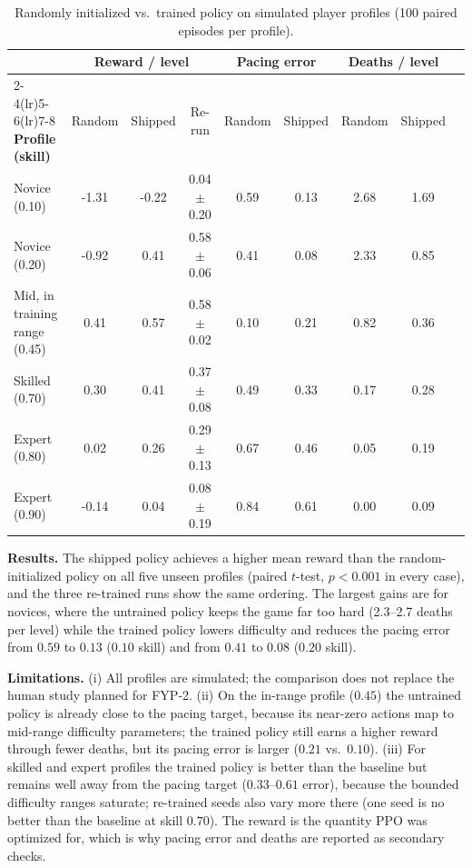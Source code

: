 \begin{table}[!htbp]
\centering
\caption{Randomly initialized vs.\ trained policy on simulated player profiles (100 paired episodes per profile).}
\label{tab:policy_eval}
\scriptsize
\begin{tabular}{p{}cccccccc}
\toprule
& \multicolumn{3}{c}{\textbf{Reward / level}} & \multicolumn{2}{c}{\textbf{Pacing error}} & \multicolumn{2}{c}{\textbf{Deaths / level}} \\
\cmidrule(lr){2-4}\cmidrule(lr){5-6}\cmidrule(lr){7-8}
\textbf{Profile (skill)} & Random & Shipped & Re-run & Random & Shipped & Random & Shipped \\
\midrule
Novice (0.10) & -1.31 & -0.22 & 0.04$\pm$0.20 & 0.59 & 0.13 & 2.68 & 1.69 \\
\midrule
Novice (0.20) & -0.92 & 0.41 & 0.58$\pm$0.06 & 0.41 & 0.08 & 2.33 & 0.85 \\
\midrule
Mid, in training range (0.45) & 0.41 & 0.57 & 0.58$\pm$0.02 & 0.10 & 0.21 & 0.82 & 0.36 \\
\midrule
Skilled (0.70) & 0.30 & 0.41 & 0.37$\pm$0.08 & 0.49 & 0.33 & 0.17 & 0.28 \\
\midrule
Expert (0.80) & 0.02 & 0.26 & 0.29$\pm$0.13 & 0.67 & 0.46 & 0.05 & 0.19 \\
\midrule
Expert (0.90) & -0.14 & 0.04 & 0.08$\pm$0.19 & 0.84 & 0.61 & 0.00 & 0.09 \\
\bottomrule
\end{tabular}
\end{table}

\textbf{Results.} The shipped policy achieves a higher mean reward than the random-initialized policy on all five unseen profiles (paired $t$-test, $p<0.001$ in every case), and the three re-trained runs show the same ordering. The largest gains are for novices, where the untrained policy keeps the game far too hard (2.3--2.7 deaths per level) while the trained policy lowers difficulty and reduces the pacing error from $0.59$ to $0.13$ ($0.10$ skill) and from $0.41$ to $0.08$ ($0.20$ skill).

\textbf{Limitations.} (i) All profiles are simulated; the comparison does not replace the human study planned for FYP-2. (ii) On the in-range profile ($0.45$) the untrained policy is already close to the pacing target, because its near-zero actions map to mid-range difficulty parameters; the trained policy still earns a higher reward through fewer deaths, but its pacing error is larger ($0.21$ vs.\ $0.10$). (iii) For skilled and expert profiles the trained policy is better than the baseline but remains well away from the pacing target ($0.33$--$0.61$ error), because the bounded difficulty ranges saturate; re-trained seeds also vary more there (one seed is no better than the baseline at skill $0.70$). The reward is the quantity PPO was optimized for, which is why pacing error and deaths are reported as secondary checks.

